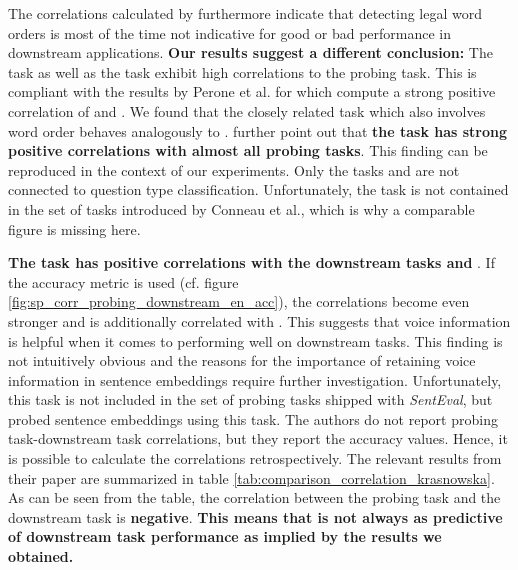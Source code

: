 The correlations calculated by \citep{Conneau.2018a} furthermore indicate that detecting legal word orders is most of the time not indicative for good or bad performance in downstream applications. \textbf{Our results suggest a different conclusion:} The  task as well as the  task exhibit high correlations to the  probing task. This is compliant with the results by Perone et al. for which \citep{Eger.2019} compute a strong positive correlation of  and . We found that the closely related  task which also involves word order behaves analogously to . \citep{Conneau.2018a} further point out that \textbf{the  task has strong positive correlations with almost all probing tasks}. This finding can be reproduced in the context of our experiments. Only the tasks  and  are not connected to question type classification. Unfortunately, the  task is not contained in the set of tasks introduced by Conneau et al., which is why a comparable figure is missing here.

\textbf{The  task has positive correlations with the downstream tasks  and }. If the accuracy metric is used (cf. figure \vref{fig:sp_corr_probing_downstream_en_acc}), the correlations become even stronger and  is additionally correlated with . This suggests that voice information is helpful when it comes to performing well on downstream tasks. This finding is not intuitively obvious and the reasons for the importance of retaining voice information in sentence embeddings require further investigation. Unfortunately, this task is not included in the set of probing tasks shipped with \textit{SentEval}, but \citep{Krasnowska.2019} probed sentence embeddings using this task. The authors do not report probing task-downstream task correlations, but they report the accuracy values. Hence, it is possible to calculate the correlations retrospectively. The relevant results from their paper are summarized in table \vref{tab:comparison_correlation_krasnowska}. As can be seen from the table, the correlation between the probing task  and the downstream task  is \textbf{negative}. \textbf{This means that  is not always as predictive of downstream task performance as implied by the results we obtained.}

